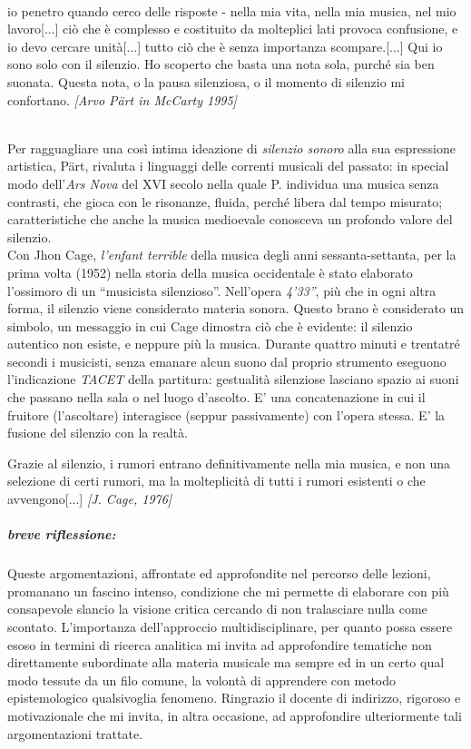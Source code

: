 \documentclass[a4paper,12pt]{article}
\newcommand{\virgo}[1]{``#1''}
\begin{document}
\\
\begin{small}[...] io penetro quando cerco delle risposte - nella mia vita, nella mia musica, nel mio lavoro[...] ciò che è complesso e costituito da molteplici lati provoca confusione, e io devo cercare unità[...] tutto ciò che è senza importanza scompare.[...] Qui io sono solo con il silenzio. Ho scoperto che basta una nota sola, purché sia ben suonata. Questa nota, o la pausa silenziosa, o il momento di silenzio mi confortano. \textit{[Arvo Pärt in McCarty 1995]}
\end{small}\\

Per ragguagliare una così intima ideazione di \textit{silenzio sonoro} alla sua espressione artistica, P\"art, rivaluta i linguaggi delle correnti musicali del passato: in special modo dell'\textit{Ars Nova} del XVI secolo nella quale P. individua una musica senza contrasti, che gioca con le risonanze, fluida, perché libera dal tempo misurato; caratteristiche che anche la musica medioevale conosceva un profondo valore del silenzio\cite{rif6}.\\
Con Jhon Cage, \textit{l'enfant terrible} della musica degli anni sessanta-settanta\cite{rif6}, per la prima volta (1952) nella storia della musica occidentale è stato elaborato l'ossimoro di un \virgo{musicista silenzioso}. Nell'opera \textit{4'33''}, più che in ogni altra forma, il silenzio viene considerato materia sonora. Questo brano è considerato un simbolo, un messaggio in cui Cage dimostra ciò che è evidente: il silenzio autentico non esiste, e neppure più la musica\cite{rif8}. Durante quattro minuti e trentatré secondi i musicisti, senza emanare alcun suono dal proprio strumento eseguono l'indicazione \small{\textit{TACET}} della partitura: gestualità silenziose lasciano spazio ai suoni che passano nella sala o nel luogo d'ascolto.  E' una concatenazione in cui il fruitore (l'ascoltare) interagisce (seppur passivamente) con l'opera stessa. E' la fusione del silenzio con la realtà.\\
\begin{small}
 Grazie al silenzio, i rumori entrano definitivamente nella mia musica, e non una selezione di certi rumori, ma la molteplicità di tutti i rumori esistenti o che avvengono[...] \textit{[J. Cage, 1976]}
\end{small}

\subparagraph*{breve riflessione:}
Queste argomentazioni, affrontate ed approfondite nel percorso delle lezioni, promanano un fascino intenso, condizione che mi permette di elaborare con più consapevole slancio la visione critica cercando di non tralasciare nulla come scontato. L'importanza dell'approccio multidisciplinare, per quanto possa essere esoso in termini di ricerca analitica mi invita ad approfondire tematiche non direttamente subordinate alla materia musicale ma sempre ed in un certo qual modo tessute da un filo comune, la volontà di apprendere con metodo epistemologico qualsivoglia fenomeno. Ringrazio il docente di indirizzo, rigoroso e motivazionale che mi invita, in altra occasione, ad approfondire ulteriormente tali  argomentazioni trattate.
 
\end{document}
